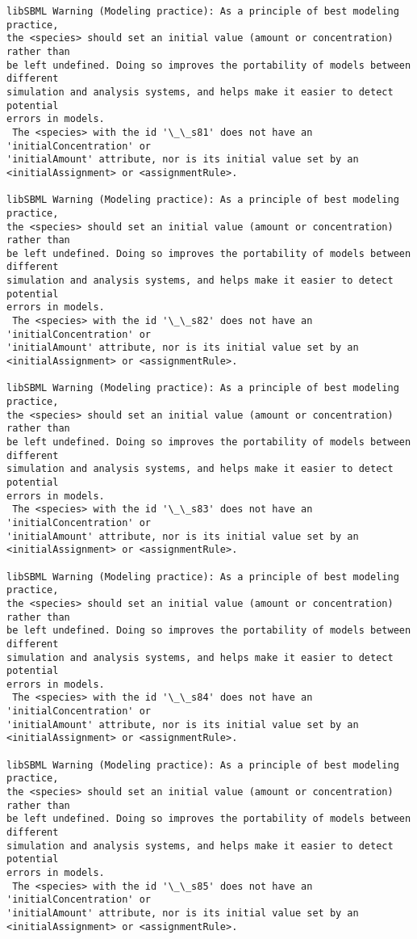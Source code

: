 \documentclass[11pt]{article}
\begin{document}
\begin{Verbatim}[commandchars=\\\{\}]
libSBML Warning (Modeling practice): As a principle of best modeling practice,
the <species> should set an initial value (amount or concentration) rather than
be left undefined. Doing so improves the portability of models between different
simulation and analysis systems, and helps make it easier to detect potential
errors in models.
 The <species> with the id '\_\_s81' does not have an 'initialConcentration' or
'initialAmount' attribute, nor is its initial value set by an
<initialAssignment> or <assignmentRule>.

libSBML Warning (Modeling practice): As a principle of best modeling practice,
the <species> should set an initial value (amount or concentration) rather than
be left undefined. Doing so improves the portability of models between different
simulation and analysis systems, and helps make it easier to detect potential
errors in models.
 The <species> with the id '\_\_s82' does not have an 'initialConcentration' or
'initialAmount' attribute, nor is its initial value set by an
<initialAssignment> or <assignmentRule>.

libSBML Warning (Modeling practice): As a principle of best modeling practice,
the <species> should set an initial value (amount or concentration) rather than
be left undefined. Doing so improves the portability of models between different
simulation and analysis systems, and helps make it easier to detect potential
errors in models.
 The <species> with the id '\_\_s83' does not have an 'initialConcentration' or
'initialAmount' attribute, nor is its initial value set by an
<initialAssignment> or <assignmentRule>.

libSBML Warning (Modeling practice): As a principle of best modeling practice,
the <species> should set an initial value (amount or concentration) rather than
be left undefined. Doing so improves the portability of models between different
simulation and analysis systems, and helps make it easier to detect potential
errors in models.
 The <species> with the id '\_\_s84' does not have an 'initialConcentration' or
'initialAmount' attribute, nor is its initial value set by an
<initialAssignment> or <assignmentRule>.

libSBML Warning (Modeling practice): As a principle of best modeling practice,
the <species> should set an initial value (amount or concentration) rather than
be left undefined. Doing so improves the portability of models between different
simulation and analysis systems, and helps make it easier to detect potential
errors in models.
 The <species> with the id '\_\_s85' does not have an 'initialConcentration' or
'initialAmount' attribute, nor is its initial value set by an
<initialAssignment> or <assignmentRule>.


\end{Verbatim}
\end{document}
